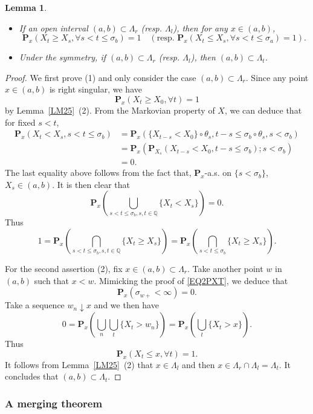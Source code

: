 \documentclass[a4paper]{amsart}
\newtheorem{lemma}[theorem]{Lemma}
\theoremstyle{definition}
\theoremstyle{remark}
\numberwithin{equation}{section}
\begin{document}
\begin{lemma}\label{LM27}
\begin{itemize}
\item[(1)] If an open interval $(a,b)\subset \Lambda_r$ (resp. $\Lambda_l$), then for any $x\in (a,b)$,
\[
	\mathbf{P}_x(X_t\geq X_s, \forall s<t\leq \sigma_b)=1 \quad (\text{resp. }\mathbf{P}_x(X_t\leq X_s, \forall s<t\leq \sigma_a)=1).
\]
\item[(2)] Under the symmetry, if $(a,b)\subset \Lambda_r$ (resp. $\Lambda_l$), then $(a,b)\subset \Lambda_t$.
\end{itemize}
\end{lemma}
\begin{proof}
We first prove (1) and only consider the case $(a,b)\subset \Lambda_r$. Since any point $x\in (a,b)$ is right singular, we have
\[
\mathbf{P}_x(X_t\geq X_0,\forall t)=1
\]
 by Lemma~\ref{LM25}~(2). From the Markovian property of $X$, we can deduce that for fixed $s<t$,
\[
\begin{aligned}
\mathbf{P}_x(X_t<X_s, s<t\leq \sigma_b) &=\mathbf{P}_x\left(\{X_{t-s}<X_0\}\circ \theta_s, t-s \leq  \sigma_b\circ \theta_s, s<\sigma_b\right) \\
&=\mathbf{P}_x\left(\mathbf{P}_{X_s}(X_{t-s}<X_0, t-s\leq \sigma_b); s<\sigma_b \right)\\
&=0.
\end{aligned}
\]
The last equality above follows from the fact that, $\mathbf{P}_x$-a.s. on $\{s<\sigma_b\}$, $X_s\in (a,b)$. It is then clear that
\[
	\mathbf{P}_x\left(\bigcup_{s<t\leq \sigma_b, s,t\in \mathbb{Q}}\{X_t<X_s\} \right)=0.
\]
Thus
\[
	1=\mathbf{P}_x\left(\bigcap_{s<t\leq \sigma_b, s,t\in \mathbb{Q}}\{X_t\geq X_s\} \right)=\mathbf{P}_x\left(\bigcap_{s<t\leq \sigma_b}\{X_t\geq X_s\} \right).
\]

For the second assertion (2), fix $x\in (a,b)\subset \Lambda_r$. Take another point $w$ in $(a,b)$ such that $x<w$. Mimicking the proof of \eqref{EQ2PXT}, we deduce that
\[
	\mathbf{P}_x(\sigma_{w+}<\infty) =0.
\]
Take a sequence $w_n\downarrow x$ and we then have
\[
0=\mathbf{P}_x\left(\bigcup_n\bigcup_{t}\{X_t> w_n\}\right)=\mathbf{P}_x\left(\bigcup_{t}\{X_t> x\}\right).
\]
Thus
\[
	\mathbf{P}_x(X_t\leq x, \forall t)=1.
\]
It follows from Lemma~\ref{LM25}~(2) that $x\in \Lambda_l$ and then $x\in \Lambda_r\cap \Lambda_l=\Lambda_t$. It concludes that $(a,b)\subset \Lambda_t$.
\end{proof}

\subsubsection{A merging theorem}\label{SEC223}
\end{document}
